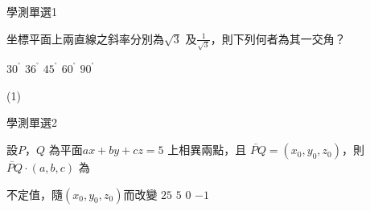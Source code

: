 \begin{QUESTIONS}
    \begin{QUESTION}
        \begin{ExamInfo}{86}{學測}{單選}{1}
        \end{ExamInfo}
        \begin{ExamAnsRateInfo}{}{}{}{}
        \end{ExamAnsRateInfo}
        \begin{QBODY}坐標平面上兩直線之斜率分別為$\sqrt{3}$ 及$\frac{1}{\sqrt{3}}$，則下列何者為其一交角？
            \begin{QOPS}
                \QOP ${{30}^{{}^\circ }}$	
                \QOP ${{36}^{{}^\circ }}$
                \QOP ${{45}^{{}^\circ }}$	
                \QOP ${{60}^{{}^\circ }}$
                \QOP ${{90}^{{}^\circ }}$
            \end{QOPS}
            
        \end{QBODY}
        \begin{QFROMS}
        \end{QFROMS}
        \begin{QTAGS}\end{QTAGS}
        \begin{QANS}
            (1)
        \end{QANS}
        \begin{QSOLLIST}
        \end{QSOLLIST}
        \begin{QEMPTYSPACE}
        \end{QEMPTYSPACE}
    \end{QUESTION}
    \begin{QUESTION}
        \begin{ExamInfo}{86}{學測}{單選}{2}
        \end{ExamInfo}
        \begin{ExamAnsRateInfo}{}{}{}{}
        \end{ExamAnsRateInfo}
        \begin{QBODY}
            設$P$，$Q$ 為平面$ax+by+cz=5$ 上相異兩點，且 $\lvec{PQ}=\left( {{x}_{0}},{{y}_{0}},{{z}_{0}} \right)$，則 $\lvec{PQ} \cdot \left( a,b,c \right)$ 為
            \begin{QOPS}
                \QOP 不定值，隨$\left( {{x}_{0}},{{y}_{0}},{{z}_{0}} \right)$而改變	
                \QOP $25$
                \QOP $5$	
                \QOP $0$
                \QOP $-1$            
            \end{QOPS}


\end{QBODY}
\end{QUESTION}
\end{QUESTIONS}
